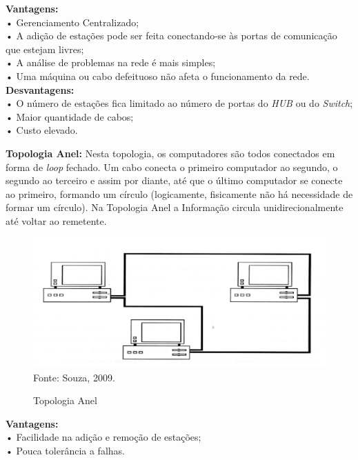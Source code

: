 \textbf{Vantagens:}\\
• Gerenciamento Centralizado;\\
• A adição de estações pode ser feita conectando-se às portas de comunicação que estejam livres;\\
• A análise de problemas na rede é mais simples;\\
• Uma máquina ou cabo defeituoso não afeta o funcionamento da rede.\\


\textbf{Desvantagens:}\\
• O número de estações fica limitado ao número de portas do \textit{HUB} ou do \textit{Switch};\\
• Maior quantidade de cabos;\\
• Custo elevado.\\


\newpage\thispagestyle{empty}
\par \textbf{Topologia Anel:} Nesta topologia, os computadores são todos conectados em forma de \textit{loop} fechado. Um cabo conecta o primeiro computador ao segundo, o segundo ao terceiro e assim por diante, até que o último computador se conecte ao primeiro, formando um círculo (logicamente, fisicamente não há necessidade de formar um círculo). Na Topologia Anel a Informação circula unidirecionalmente até voltar ao remetente.

\begin{figure}[htbp]
	\centering
	\caption{Topologia Anel}
	\includegraphics[]{imagens/topologia-anel.png}
	{\\Fonte: Souza, 2009.}
	\label{fig:criação_1}
\end{figure}

\textbf{Vantagens:}\\
• Facilidade na adição e remoção de estações;\\
• Pouca tolerância a falhas.\\


